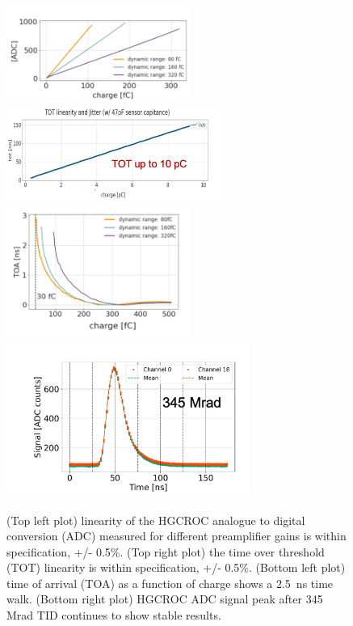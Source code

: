 \documentclass[twocolumn]{webofc}
\begin{document}
\begin{figure}[ht]
\centering
\includegraphics[width=6cm]{figures/roc-ADClinearity.png}
\hspace{1cm}
\includegraphics[width=7cm]{figures/roc-TOTlinearity.png}\\
\includegraphics[width=6cm]{figures/roc-toaTimewalk.png}
\includegraphics[width=8cm]{figures/roc-ADCirradiation.png}
\caption{(Top left plot) linearity of the HGCROC analogue to digital conversion (ADC) measured for different preamplifier gains is within specification, +/- 0.5\%. (Top right plot) the time over threshold (TOT) linearity is within specification, +/- 0.5\%. (Bottom left plot) time of arrival (TOA) as a function of charge shows a 2.5~ns time walk. (Bottom right plot) HGCROC ADC signal peak after 345 Mrad TID continues to show stable results.}
\label{fig:roc}
\vspace*{-0.6cm}
\end{figure}
\end{document}
